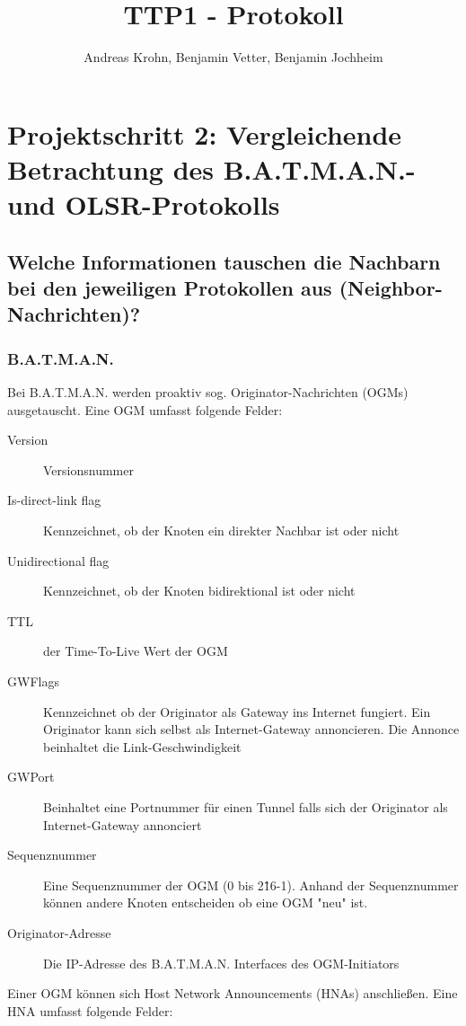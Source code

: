 \documentclass[a4paper,10pt]{article}
\title{TTP1 - Protokoll}
\author{Andreas Krohn, Benjamin Vetter, Benjamin Jochheim}
\begin{document}
\maketitle

\section{Projektschritt 2: Vergleichende Betrachtung des B.A.T.M.A.N.- und OLSR-Protokolls}

\subsection{Welche Informationen tauschen die Nachbarn bei den jeweiligen Protokollen aus (Neighbor-Nachrichten)?}


\subsubsection*{B.A.T.M.A.N.}

Bei B.A.T.M.A.N. werden proaktiv sog. Originator-Nachrichten (OGMs) ausgetauscht.
Eine OGM umfasst folgende Felder: 

\begin{description}
  \item[Version] Versionsnummer
  \item[Is-direct-link flag] Kennzeichnet, ob der Knoten ein direkter Nachbar ist oder nicht
  \item[Unidirectional flag] Kennzeichnet, ob der Knoten bidirektional ist oder nicht
  \item[TTL] der Time-To-Live Wert der OGM
  \item[GWFlags] Kennzeichnet ob der Originator als Gateway ins Internet fungiert. Ein Originator kann sich selbst als Internet-Gateway annoncieren. Die Annonce beinhaltet die Link-Geschwindigkeit 
  \item[GWPort] Beinhaltet eine Portnummer für einen Tunnel falls sich der Originator als Internet-Gateway annonciert
  \item[Sequenznummer] Eine Sequenznummer der OGM (0 bis 2\^16-1). Anhand der Sequenznummer können andere Knoten entscheiden ob eine OGM "neu" ist.
  \item[Originator-Adresse] Die IP-Adresse des B.A.T.M.A.N. Interfaces des OGM-Initiators
\end{description}

Einer OGM können sich Host Network Announcements (HNAs) anschließen. 
Eine HNA umfasst folgende Felder: 
\end{document}
